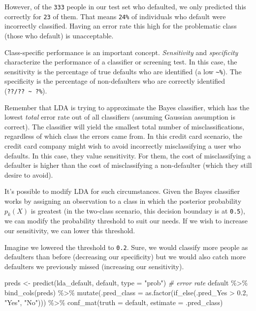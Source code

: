 \documentclass[
]{article}
\newenvironment{Shaded}{\begin{snugshade}}{\end{snugshade}}
\newcommand{\AttributeTok}[1]{\textcolor[rgb]{0.77,0.63,0.00}{#1}}
\newcommand{\CommentTok}[1]{\textcolor[rgb]{0.56,0.35,0.01}{\textit{#1}}}
\newcommand{\FloatTok}[1]{\textcolor[rgb]{0.00,0.00,0.81}{#1}}
\newcommand{\FunctionTok}[1]{\textcolor[rgb]{0.00,0.00,0.00}{#1}}
\newcommand{\NormalTok}[1]{#1}
\newcommand{\OtherTok}[1]{\textcolor[rgb]{0.56,0.35,0.01}{#1}}
\newcommand{\SpecialCharTok}[1]{\textcolor[rgb]{0.00,0.00,0.00}{#1}}
\newcommand{\StringTok}[1]{\textcolor[rgb]{0.31,0.60,0.02}{#1}}
\begin{document}
However, of the \texttt{333} people in our test set who defaulted, we
only predicted this correctly for \texttt{23} of them. That means
\texttt{24\%} of individuals who default were incorrectly classified.
Having an error rate this high for the problematic class (those who
default) is unacceptable.

Class-specific performance is an important concept. \emph{Sensitivity}
and \emph{specificity} characterize the performance of a classifier or
screening test. In this case, the sensitivity is the percentage of true
defaults who are identified (a low \texttt{\textasciitilde{}\%}). The
specificity is the percentage of non-defaulters who are correctly
identified (\texttt{??/??\ \textasciitilde{}\ ?\%}).

Remember that LDA is trying to approximate the Bayes classifier, which
has the lowest \emph{total} error rate out of all classifiers (assuming
Gaussian assumption is correct). The classifier will yield the smallest
total number of misclassifications, regardless of which class the errors
came from. In this credit card scenario, the credit card company might
wish to avoid incorrectly misclassifying a user who defaults. In this
case, they value sensitivity. For them, the cost of misclassifying a
defaulter is higher than the cost of misclassifying a non-defaulter
(which they still desire to avoid).

It's possible to modify LDA for such circumstances. Given the Bayes
classifier works by assigning an observation to a class in which the
posterior probability \(p_k(X)\) is greatest (in the two-class scenario,
this decision boundary is at \texttt{0.5}), we can modify the
probability threshold to suit our needs. If we wish to increase our
sensitivity, we can lower this threshold.

Imagine we lowered the threshold to \texttt{0.2}. Sure, we would
classify more people as defaulters than before (decreasing our
specificity) but we would also catch more defaulters we previously
missed (increasing our sensitivity).

\begin{Shaded}
\begin{Highlighting}[]
\NormalTok{preds }\OtherTok{\textless{}{-}} \FunctionTok{predict}\NormalTok{(lda\_default, default, }\AttributeTok{type =} \StringTok{"prob"}\NormalTok{)}
\CommentTok{\# error rate}
\NormalTok{default }\SpecialCharTok{\%\textgreater{}\%}
  \FunctionTok{bind\_cols}\NormalTok{(preds) }\SpecialCharTok{\%\textgreater{}\%}
  \FunctionTok{mutate}\NormalTok{(}\AttributeTok{.pred\_class =} \FunctionTok{as.factor}\NormalTok{(}\FunctionTok{if\_else}\NormalTok{(.pred\_Yes }\SpecialCharTok{\textgreater{}} \FloatTok{0.2}\NormalTok{, }\StringTok{"Yes"}\NormalTok{, }\StringTok{"No"}\NormalTok{))) }\SpecialCharTok{\%\textgreater{}\%}
  \FunctionTok{conf\_mat}\NormalTok{(}\AttributeTok{truth =}\NormalTok{ default, }\AttributeTok{estimate =}\NormalTok{ .pred\_class)}
\end{Highlighting}
\end{Shaded}
\end{document}
